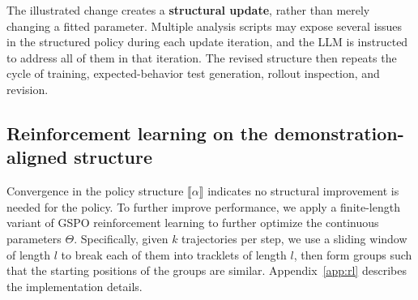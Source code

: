The illustrated change creates a \textbf{structural update}, rather than merely changing a fitted parameter.
Multiple analysis scripts may expose several issues in the structured policy during each update iteration, and the LLM is instructed to address all of them in that iteration.
The revised structure then repeats the cycle of training, expected-behavior test generation, rollout inspection, and revision.

\subsection{Reinforcement learning on the demonstration-aligned structure}
\label{sec:rl-method}

Convergence in the policy structure $\llbracket \alpha \rrbracket$ indicates no structural improvement is needed for the policy.
To further improve performance, we apply a finite-length variant of GSPO \citep{zheng2025group} reinforcement learning to further optimize the continuous parameters $\Theta$.
Specifically, given $k$ trajectories per step, we use a sliding window of length $l$ to break each of them into tracklets of length $l$, then form groups such that the starting positions of the groups are similar.
Appendix~\ref{app:rl} describes the implementation details.